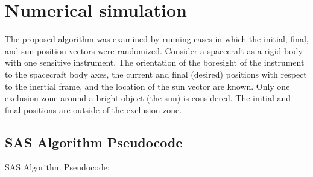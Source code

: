 \documentclass[letterpaper, preprint, paper,11pt]{AAS}	%
\begin{document}
%	
%	
\clearpage 

	\section{Numerical simulation} 
	The proposed algorithm was examined by running cases in which the initial, final, and sun position vectors were randomized. Consider a spacecraft as a rigid body with one sensitive instrument. The orientation of the boresight of the instrument to the spacecraft body axes, the current and final (desired) positions with respect to the inertial frame, and the location of the sun vector are known. Only one exclusion zone around a bright object (the sun) is considered. The initial and final positions are outside of the exclusion zone.  
	
	\subsection{SAS Algorithm Pseudocode}
	SAS Algorithm Pseudocode: 
	
\end{document}
